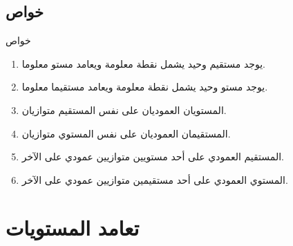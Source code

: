 \documentclass[dvipsnames,mathserif]{beamer}
\makeatletter
\newcommand{\leftm}{\@totalleftmargin}
\makeatother
\begin{document}
\subsection{خواص}
\begin{frame}{خواص}

\begin{exampleblock}{}
\begin{enumerate}\rightskip\leftm
\item<2-> 
يوجد مستقيم وحيد يشمل نقطة معلومة ويعامد مستو معلوما.

\item<2->
يوجد مستو وحيد يشمل نقطة معلومة ويعامد مستقيما معلوما.

\vspace{5mm}

\item<3->
المستويان العموديان على نفس المستقيم متوازيان.

\item<3->
المستقيمان العموديان على نفس المستوي متوازيان.

\vspace{5mm}

\item<4->
المستقيم العمودي على أحد مستويين متوازيين عمودي على الآخر.

\item<4->
المستوي العمودي على أحد مستقيمين متوازيين عمودي على الآخر.

\end{enumerate}
\end{exampleblock}

\end{frame}



\section{تعامد المستويات}
\end{document}
